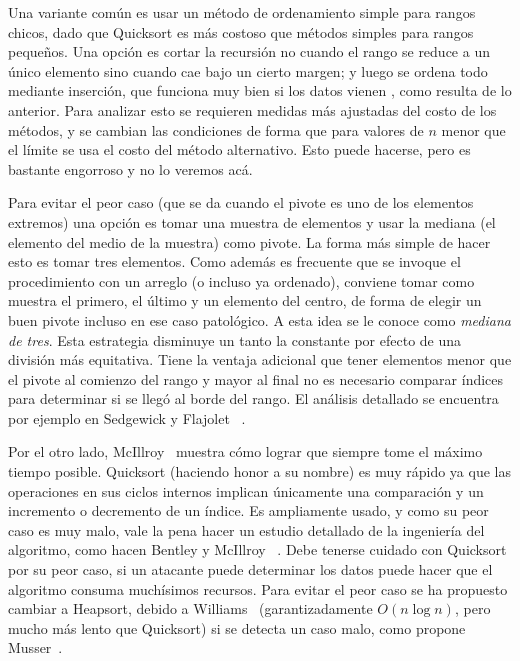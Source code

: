   Una variante común
  es usar un método de ordenamiento simple para rangos chicos,
  dado que Quicksort es más costoso que métodos simples para rangos pequeños.
  Una opción es cortar la recursión
  no cuando el rango se reduce a un único elemento
  sino cuando cae bajo un cierto margen;
  y luego se ordena todo mediante inserción,
  que funciona muy bien si los datos vienen ,
  como resulta de lo anterior.
  Para analizar esto se requieren medidas más ajustadas
  del costo de los métodos,
  y se cambian las condiciones de forma que para valores de \(n\)
  menor que el límite se usa el costo del método alternativo.
  Esto puede hacerse,
  pero es bastante engorroso y no lo veremos acá.

  Para evitar el peor caso
  (que se da cuando el pivote es uno de los elementos extremos)
  una opción es tomar una muestra de elementos y usar la mediana
  (el elemento del medio de la muestra)
  como pivote.
  La forma más simple de hacer esto es tomar tres elementos.
  Como además es frecuente que se invoque el procedimiento con un arreglo
  (o incluso ya ordenado),
  conviene tomar como muestra el primero,
  el último
  y un elemento del centro,
  de forma de elegir un buen pivote incluso en ese caso patológico.
  A esta idea se le conoce como \emph{mediana de tres}.
  Esta estrategia disminuye un tanto la constante
  por efecto de una división más equitativa.
  Tiene la ventaja adicional
  que tener elementos menor que el pivote al comienzo del rango
  y mayor al final
  no es necesario comparar índices para determinar
  si se llegó al borde del rango.
  El análisis detallado se encuentra por ejemplo en Sedgewick y Flajolet~%
    \cite{sedgewick13:_introd_anal_algor}.

  Por el otro lado,
  McIllroy~\cite{mcillroy99:_killer_adver_quicksort}
  muestra cómo lograr que siempre tome el máximo tiempo posible.
  Quicksort
  (haciendo honor a su nombre)
  es muy rápido
  ya que las operaciones en sus ciclos internos
  implican únicamente una comparación
  y un incremento o decremento de un índice.
  Es ampliamente usado,
  y como su peor caso es muy malo,
  vale la pena hacer un estudio detallado de la ingeniería del algoritmo,
  como hacen Bentley y McIllroy~%
    \cite{bentley93:_engin_sort_funct}.
  Debe tenerse cuidado con Quicksort por su peor caso,
  si un atacante puede determinar los datos
  puede hacer que el algoritmo consuma muchísimos recursos.
  Para evitar el peor caso se ha propuesto cambiar a Heapsort,
  debido a Williams~%
    \cite{williams64:_alg_heapsort}
  (garantizadamente \(O(n \log n)\),
   pero mucho más lento que Quicksort)
  si se detecta un caso malo,
  como propone Musser~\cite{musser97:_introsort}.

